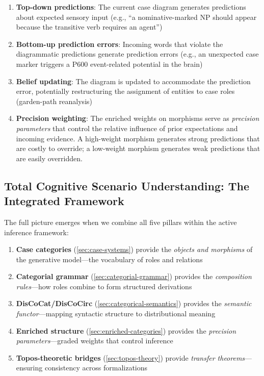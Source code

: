 \documentclass[
]{article}
\providecommand{\tightlist}{%
  \setlength{\itemsep}{0pt}\setlength{\parskip}{0pt}}
\numberwithin{equation}{section}
\begin{document}
\begin{enumerate}
\def\labelenumi{\arabic{enumi}.}
\item
  \textbf{Top-down predictions}: The current case diagram generates
  predictions about expected sensory input (e.g., ``a nominative-marked
  NP should appear because the transitive verb requires an agent'')
\item
  \textbf{Bottom-up prediction errors}: Incoming words that violate the
  diagrammatic predictions generate prediction errors (e.g., an
  unexpected case marker triggers a P600 event-related potential in the
  brain)
\item
  \textbf{Belief updating}: The diagram is updated to accommodate the
  prediction error, potentially restructuring the assignment of entities
  to case roles (garden-path reanalysis)
\item
  \textbf{Precision weighting}: The enriched weights on morphisms serve
  as \emph{precision parameters} that control the relative influence of
  prior expectations and incoming evidence. A high-weight morphism
  generates strong predictions that are costly to override; a low-weight
  morphism generates weak predictions that are easily overridden.
\end{enumerate}

\subsection{Total Cognitive Scenario Understanding: The Integrated
Framework}\label{total-cognitive-scenario-understanding-the-integrated-framework}

The full picture emerges when we combine all five pillars within the
active inference framework:

\begin{enumerate}
\def\labelenumi{\arabic{enumi}.}
\tightlist
\item
  \textbf{Case categories} (\autoref{sec:case-systems}) provide the
  \emph{objects and morphisms} of the generative model---the vocabulary
  of roles and relations
\item
  \textbf{Categorial grammar} (\autoref{sec:categorial-grammar})
  provides the \emph{composition rules}---how roles combine to form
  structured derivations
\item
  \textbf{DisCoCat/DisCoCirc} (\autoref{sec:categorical-semantics})
  provides the \emph{semantic functor}---mapping syntactic structure to
  distributional meaning
\item
  \textbf{Enriched structure} (\autoref{sec:enriched-categories})
  provides the \emph{precision parameters}---graded weights that control
  inference
\item
  \textbf{Topos-theoretic bridges} (\autoref{sec:topos-theory}) provide
  \emph{transfer theorems}---ensuring consistency across formalizations
\end{enumerate}
\end{document}
